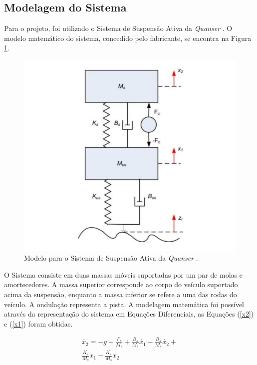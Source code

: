 \documentclass[journal,brazil,english]{IEEEtran}
\begin{document}
\subsection{Modelagem do Sistema}\label{modelagem}
Para o projeto, foi utilizado o Sistema de Suspensão Ativa da \textit{Quanser} \cite{quanser}. O modelo matemático do sistema, concedido pelo fabricante, se encontra na Figura \ref{suspensao}.

\begin{figure}[H]
	\centering
	\includegraphics[width=\columnwidth]{./imagens/suspensao.pdf}
    \renewcommand{\figurename}{Fig.}
	\caption{Modelo para o Sistema de Suspensão Ativa da \textit{Quanser} \protect\cite{quanser}.}
	\label{suspensao}
\end{figure}

O Sistema consiste em duas massas móveis suportadas por um par de molas e amortecedores. A massa superior corresponde ao corpo do veículo suportado acima da suspensão, enquanto a massa inferior se refere a uma das rodas do veículo. A ondulação representa a pista.
A modelagem matemática foi possível através da representação do sistema em Equações Diferenciais, as Equações (\ref{x2}) e (\ref{x1}) foram obtidas.

\begin{equation}\label{x2}
\begin{matrix}
\ddot{x_2} = -g + \frac{F_c}{M_s} + \frac{B_s}{M_s}\dot{x_1} - \frac{B_s}{M_s}\dot{x_2} +\\ \frac{K_s}{M_s}x_1 -\frac{K_s}{M_s}x_2
\end{matrix}
\end{equation}
\end{document}
